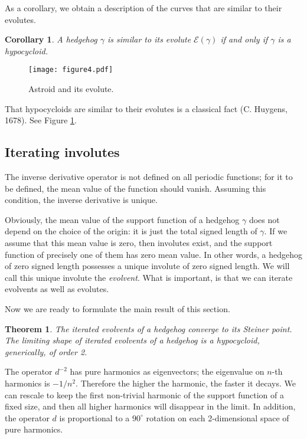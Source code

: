 \documentclass[12pt]{article}
\makeatletter
\newtheorem{theorem}{Theorem}
\newtheorem{corollary}[lemma]{Corollary}
\renewenvironment{proof}[1][\proofname] 
{\par\pushQED{\qed}\normalfont\topsep6\p@\@plus6\p@\relax\trivlist\item[\hskip\labelsep\bfseries#1\@addpunct{.}]\ignorespaces}{\popQED\endtrivlist\@endpefalse}
\newcommand{\g}{{\gamma}}
\makeatother
\begin{document}
As a corollary, we obtain a description of the curves that are similar to their 
evolutes.

\begin{corollary}
\label{similar}
A hedgehog $\g$ is similar to its evolute $\mathcal{E}(\g)$ if and only if $\g$ is a hypocycloid. 
\end{corollary} 

\begin{figure}[hbtp]
\centering
\texttt{[image: figure4.pdf]}
\caption{Astroid and its evolute.}
\label{astroid}
\end{figure}

That hypocycloids are similar to their evolutes is a classical fact (C. Huygens, 1678).  See Figure \ref{astroid}. 

\subsection{Iterating involutes}\label{Involute}

The inverse derivative operator is not defined on all periodic functions; for it to be defined, the mean value of the function should vanish.  Assuming this condition, the inverse derivative is  unique. 

Obviously, the mean value of the support function of a hedgehog $\g$ does not depend on the choice of the origin: it is just the total signed length of $\g$. If we assume that this mean value is zero, then involutes exist, and the support function of precisely one of them has zero mean value. In other words, a hedgehog of zero signed length possesses a unique involute of zero signed length. We will call this unique involute the {\it evolvent}. What is important, is that we can iterate evolvents as well as evolutes.

Now we are ready to formulate the main result of this section.

\begin{theorem}
\label{limhypo}
The iterated evolvents of a hedgehog converge to its Steiner point. The limiting shape of iterated evolvents of a hedgehog is a hypocycloid, generically, of order 2.
\end{theorem}

\begin{proof} The  operator $d^{-2}$ has pure harmonics as eigenvectors; the eigenvalue on $n$-th  harmonics  is $-1/n^2$. Therefore the higher the harmonic, the faster it decays. We can rescale to keep the first non-trivial harmonic of the support function of a fixed size, and then all higher harmonics will disappear in the limit. In addition, the operator $d$ is proportional to a $90^{\circ}$ rotation on each 2-dimensional space of pure harmonics.\end{proof}
\end{document}
